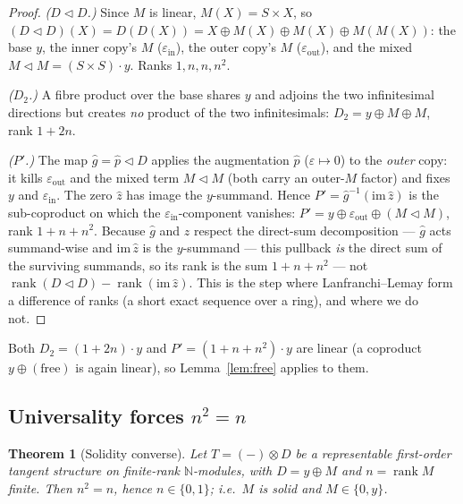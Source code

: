 \documentclass[11pt]{article}
\newtheorem{theorem}{Theorem}
\theoremstyle{definition}
\newcommand{\N}{\mathbb{N}}
\newcommand{\rank}{\operatorname{rank}}
\begin{document}
\begin{proof}
\emph{($D\lhd D$.)} Since $M$ is linear, $M(X)=S\times X$, so
$(D\lhd D)(X)=D(D(X))=X\oplus M(X)\oplus M(X)\oplus M(M(X))$: the base $y$, the inner copy's $M$
($\varepsilon_{\mathrm{in}}$), the outer copy's $M$ ($\varepsilon_{\mathrm{out}}$), and the mixed
$M\lhd M=(S\times S)\cdot y$. Ranks $1,n,n,n^2$.

\emph{($D_2$.)} A fibre product over the base shares $y$ and adjoins the two infinitesimal
directions but creates \emph{no} product of the two infinitesimals: $D_2=y\oplus M\oplus M$, rank
$1+2n$.

\emph{($P'$.)} The map $\hat g=\hat p\lhd D$ applies the augmentation $\hat p$ ($\varepsilon\mapsto0$)
to the \emph{outer} copy: it kills $\varepsilon_{\mathrm{out}}$ and the mixed term $M\lhd M$ (both
carry an outer-$M$ factor) and fixes $y$ and $\varepsilon_{\mathrm{in}}$. The zero $\hat z$ has
image the $y$-summand. Hence $P'=\hat g^{-1}(\mathrm{im}\,\hat z)$ is the sub-coproduct on which the
$\varepsilon_{\mathrm{in}}$-component vanishes:
$P'=y\oplus\varepsilon_{\mathrm{out}}\oplus(M\lhd M)$, rank $1+n+n^2$. Because $\hat g$ and $\hat z$
respect the direct-sum decomposition --- $\hat g$ acts summand-wise and $\mathrm{im}\,\hat z$ is the
$y$-summand --- this pullback \emph{is} the direct sum of the surviving summands, so its rank is the
sum $1+n+n^2$ --- not $\rank(D\lhd D)-\rank(\mathrm{im}\,\hat z)$. This is the step where
Lanfranchi--Lemay form a difference of ranks (a short exact sequence over a ring), and where we do
not.
\end{proof}

Both $D_2=(1+2n)\cdot y$ and $P'=(1+n+n^2)\cdot y$ are linear (a coproduct $y\oplus(\text{free})$ is
again linear), so Lemma~\ref{lem:free} applies to them.

\subsection{Universality forces $n^2=n$}

\begin{theorem}[Solidity converse]\label{thm:converse}
Let $T=(-)\otimes D$ be a representable first-order tangent structure on finite-rank $\N$-modules,
with $D=y\oplus M$ and $n=\rank M$ finite. Then $n^2=n$, hence $n\in\{0,1\}$; i.e.\ $M$
is solid and $M\in\{0,y\}$.
\end{theorem}
\end{document}
